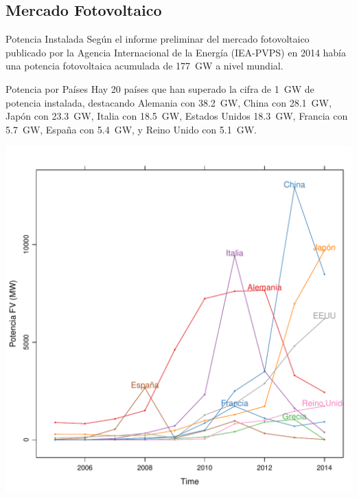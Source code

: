 \documentclass[xcolor={usenames,svgnames,dvipsnames}]{beamer}
\begin{document}
\subsection{Mercado Fotovoltaico}
\label{sec:orgd17d7fb}

\begin{frame}[label={sec:org353bb6f}]{Potencia Instalada}
Según el informe preliminar del mercado fotovoltaico publicado por la
Agencia Internacional de la Energía (IEA-PVPS) en 2014 había una
potencia fotovoltaica acumulada de \SI{177}{\giga\watt} a nivel
mundial.
\end{frame}

\begin{frame}[label={sec:orgce67e0a}]{Potencia por Países}
Hay 20 países que han superado la cifra de \SI{1}{\giga\watt} de
potencia instalada, destacando Alemania con \SI{38.2}{\giga\watt},
China con \SI{28.1}{\giga\watt}, Japón con \SI{23.3}{\giga\watt},
Italia con \SI{18.5}{\giga\watt}, Estados Unidos
\SI{18.3}{\giga\watt}, Francia con \SI{5.7}{\giga\watt}, España con
\SI{5.4}{\giga\watt}, y Reino Unido con \SI{5.1}{\giga\watt}.
\end{frame}

\begin{frame}[label={sec:org8426cbc}]{}
\begin{center}
\includegraphics[width=.9\linewidth]{../figs/PVWorld.pdf}
\end{center}
\end{frame}
\end{document}
